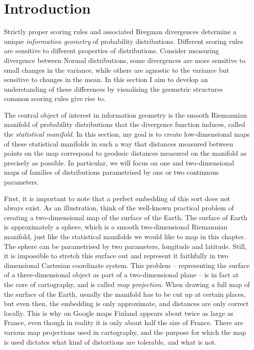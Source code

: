 \section{Introduction}

Strictly proper scoring rules and associated Bregman divergences determine a unique \emph{information geometry} of probability distributions. Different scoring rules are sensitive to different properties of distributions. Consider measuring divergence between Normal distributions, some divergences are more sensitive to small changes in the variance, while others are agnostic to the variance but sensitive to changes in the mean. In this section I aim to develop an understanding of these differences by visualising the geometric structures common scoring rules give rise to.

The central object of interest in information geometry is the smooth Riemannian manifold of probability distributions that the divergence function induces, called the \emph{statistical manifold}. In this section, my
 goal is to create low-dimensional maps of these statistical manifolds in such a way that distances measured between points on the map correspond to geodesic distances measured on the manifold as precisely as possible. In particular, we will focus on one and two-dimensional maps of families of distributions parametrised by one or two continuous parameters.

First, it is important to note that a perfect embedding of this sort does not always exist. As an illustration, think of the well-known practical problem of creating a two-dimensional map of the surface of the Earth. The surface of Earth is approximately a sphere, which is a smooth two-dimensional Riemannian manifold, just like the statistical manifolds we would like to map in this chapter. The sphere can be parametrised by two parameters, longitude and latitude. Still, it is impossible to stretch this surface out and represent it faithfully in two dimensional Cartesian coordinate system. This problem -- representing the surface of a three-dimensional object as part of a two-dimensional plane -- is in fact at the core of cartography, and is called \emph{map projection}. When drawing a full map of the surface of the Earth, usually the manifold has to be cut up at certain places, but even then, the embedding is only approximate, and distances are only correct locally. This is why on Google maps Finland appears about twice as large as France, even though in reality it is only about half the size of France. There are various map projections used in cartography, and the purpose for which the map is used dictates what kind of distortions are tolerable, and what is not.

